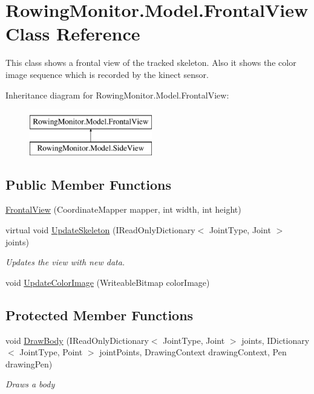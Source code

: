 \hypertarget{class_rowing_monitor_1_1_model_1_1_frontal_view}{}\section{Rowing\+Monitor.\+Model.\+Frontal\+View Class Reference}
\label{class_rowing_monitor_1_1_model_1_1_frontal_view}


This class shows a frontal view of the tracked skeleton. Also it shows the color image sequence which is recorded by the kinect sensor.  


Inheritance diagram for Rowing\+Monitor.\+Model.\+Frontal\+View\+:\begin{figure}[H]
\begin{center}
\leavevmode
\includegraphics[height=2.000000cm]{class_rowing_monitor_1_1_model_1_1_frontal_view}
\end{center}
\end{figure}
\subsection*{Public Member Functions}
\begin{DoxyCompactItemize}
\item 
\hyperlink{class_rowing_monitor_1_1_model_1_1_frontal_view_aa02b93cf606fc1d6fb0159ed39a53f5c}{Frontal\+View} (Coordinate\+Mapper mapper, int width, int height)
\item 
virtual void \hyperlink{class_rowing_monitor_1_1_model_1_1_frontal_view_a3dddfa75ba346fdcf99dbd763e9ea1ea}{Update\+Skeleton} (I\+Read\+Only\+Dictionary$<$ Joint\+Type, Joint $>$ joints)
\begin{DoxyCompactList}\small\item\em Updates the view with new data. \end{DoxyCompactList}\item 
void \hyperlink{class_rowing_monitor_1_1_model_1_1_frontal_view_aa1fda6d35d7fa125830ce5c9c64f92d5}{Update\+Color\+Image} (Writeable\+Bitmap color\+Image)
\end{DoxyCompactItemize}
\subsection*{Protected Member Functions}
\begin{DoxyCompactItemize}
\item 
void \hyperlink{class_rowing_monitor_1_1_model_1_1_frontal_view_af65ccffe0927daa614219f7db3765831}{Draw\+Body} (I\+Read\+Only\+Dictionary$<$ Joint\+Type, Joint $>$ joints, I\+Dictionary$<$ Joint\+Type, Point $>$ joint\+Points, Drawing\+Context drawing\+Context, Pen drawing\+Pen)
\begin{DoxyCompactList}\small\item\em Draws a body \end{DoxyCompactList}\end{DoxyCompactItemize}
